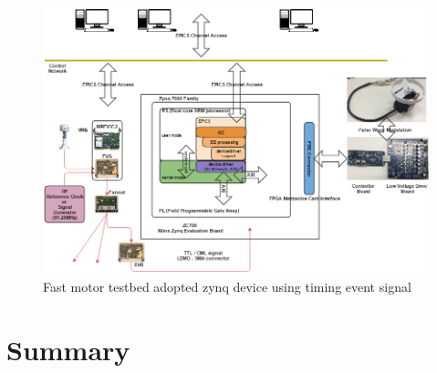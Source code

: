 \documentclass[a4paper,
              ]{jacow}
\begin{document}
\begin{figure}[!tbh]
    \centering
    \includegraphics*[width=\textwidth,height=0.7\textwidth]{motor-testbed}
    \caption{Fast motor testbed adopted zynq device using timing event signal}
    \label{stepper}
\end{figure}


\section{Summary}
\end{document}
